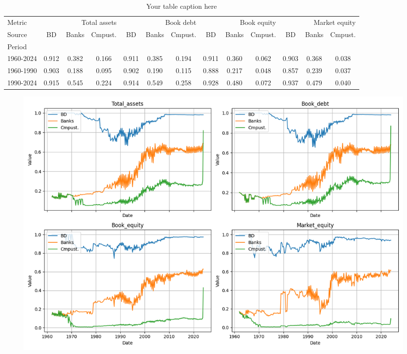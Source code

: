 \documentclass{article}
\begin{document}
\begin{adjustbox}{max width=\textwidth}

    \usepackage{booktabs} %
    \usepackage{graphicx} %
    \usepackage{adjustbox} %

    \begin{table}[htbp]
      \centering
      \caption{Your table caption here}
      \label{tab:yourlabel}
      \begin{adjustbox}{max width=\textwidth}
      \small
      \begin{tabular}{lcccccccccccc}
\toprule
Metric & \multicolumn{3}{r}{Total assets} & \multicolumn{3}{r}{Book debt} & \multicolumn{3}{r}{Book equity} & \multicolumn{3}{r}{Market equity} \\
Source & BD & Banks & Cmpust. & BD & Banks & Cmpust. & BD & Banks & Cmpust. & BD & Banks & Cmpust. \\
Period &  &  &  &  &  &  &  &  &  &  &  &  \\
\midrule
1960-2024 & 0.912 & 0.382 & 0.166 & 0.911 & 0.385 & 0.194 & 0.911 & 0.360 & 0.062 & 0.903 & 0.368 & 0.038 \\
1960-1990 & 0.903 & 0.188 & 0.095 & 0.902 & 0.190 & 0.115 & 0.888 & 0.217 & 0.048 & 0.857 & 0.239 & 0.037 \\
1990-2024 & 0.915 & 0.545 & 0.224 & 0.914 & 0.549 & 0.258 & 0.928 & 0.480 & 0.072 & 0.937 & 0.479 & 0.040 \\
\bottomrule
\end{tabular}

      \end{adjustbox}
    \end{table}
    \end{adjustbox}

\begin{figure}[htbp]\centering\includegraphics[width=\linewidth]{updated_table02_figure.png}\caption{}\end{figure}\par
\end{document}
